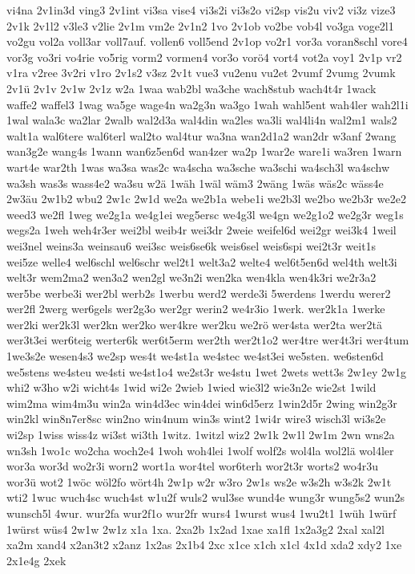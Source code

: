 {vi4na
2v1in3d
ving3
2v1int
vi3sa
vise4
vi3s2i
vi3s2o
vi2sp
vis2u
viv2
vi3z
vize3
2v1k
2v1l2
v3le3
v2lie
2v1m
vm2e
2v1n2
1vo
2v1ob
vo2be
vob4l
vo3ga
voge2l1
vo2gu
vol2a
voll3ar
voll7auf.
vollen6
voll5end
2v1op
vo2r1
vor3a
voran8schl
vore4
vor3g
vo3ri
vo4rie
vo5rig
vorm2
vormen4
vor3o
vorö4
vort4
vot2a
voy1
2v1p
vr2
v1ra
v2ree
3v2ri
v1ro
2v1s2
v3sz
2v1t
vue3
vu2enu
vu2et
2vumf
2vumg
2vumk
2v1ü
2v1v
2v1w
2v1z
w2a
1waa
wab2bl
wa3che
wach8stub
wach4t4r
1wack
waffe2
waffel3
1wag
wa5ge
wage4n
wa2g3n
wa3go
1wah
wahl5ent
wah4ler
wah2l1i
1wal
wala3c
wa2lar
2walb
wal2d3a
wal4din
wa2les
wa3li
wal4li4n
wal2m1
wals2
walt1a
wal6tere
wal6terl
wal2to
wal4tur
wa3na
wan2d1a2
wan2dr
w3anf
2wang
wan3g2e
wang4s
1wann
wan6z5en6d
wan4zer
wa2p
1war2e
ware1i
wa3ren
1warn
wart4e
war2th
1was
wa3sa
was2c
wa4scha
wa3sche
wa3schi
wa4sch3l
wa4schw
wa3sh
was3s
wass4e2
wa3su
w2ä
1wäh
1wäl
wäm3
2wäng
1wäs
wäs2c
wäss4e
2w3äu
2w1b2
wbu2
2w1c
2w1d
we2a
we2b1a
webe1i
we2b3l
we2bo
we2b3r
we2e2
weed3
we2fl
1weg
we2g1a
we4g1ei
weg5ersc
we4g3l
we4gn
we2g1o2
we2g3r
weg1s
wegs2a
1weh
weh4r3er
wei2bl
weib4r
wei3dr
2weie
weifel6d
wei2gr
wei3k4
1weil
wei3nel
weins3a
weinsau6
wei3sc
weis6se6k
weis6sel
weis6spi
wei2t3r
weit1s
wei5ze
welle4
wel6schl
wel6schr
wel2t1
welt3a2
welte4
wel6t5en6d
wel4th
welt3i
welt3r
wem2ma2
wen3a2
wen2gl
we3n2i
wen2ka
wen4kla
wen4k3ri
we2r3a2
wer5be
werbe3i
wer2bl
werb2s
1werbu
werd2
werde3i
5werdens
1werdu
werer2
wer2fl
2werg
wer6gels
wer2g3o
wer2gr
werin2
we4r3io
1werk.
wer2k1a
1werke
wer2ki
wer2k3l
wer2kn
wer2ko
wer4kre
wer2ku
we2rö
wer4sta
wer2ta
wer2tä
wer3t3ei
wer6teig
werter6k
wer6t5erm
wer2th
wer2t1o2
wer4tre
wer4t3ri
wer4tum
1we3s2e
wesen4s3
we2sp
wes4t
we4st1a
we4stec
we4st3ei
we5sten.
we6sten6d
we5stens
we4steu
we4sti
we4st1o4
we2st3r
we4stu
1wet
2wets
wett3s
2w1ey
2w1g
whi2
w3ho
w2i
wicht4s
1wid
wi2e
2wieb
1wied
wie3l2
wie3n2e
wie2st
1wild
wim2ma
wim4m3u
win2a
win4d3ec
win4dei
win6d5erz
1win2d5r
2wing
win2g3r
win2kl
win8n7er8sc
win2no
win4num
win3s
wint2
1wi4r
wire3
wisch3l
wi3s2e
wi2sp
1wiss
wiss4z
wi3st
wi3th
1witz.
1witzl
wiz2
2w1k
2w1l
2w1m
2wn
wns2a
wn3sh
1wo1c
wo2cha
woch2e4
1woh
woh4lei
1wolf
wolf2s
wol4la
wol2lä
wol4ler
wor3a
wor3d
wo2r3i
worn2
wort1a
wor4tel
wor6terh
wor2t3r
worts2
wo4r3u
wor3ü
wot2
1wöc
wöl2fo
wört4h
2w1p
w2r
w3ro
2w1s
ws2e
w3s2h
w3s2k
2w1t
wti2
1wuc
wuch4sc
wuch4st
w1u2f
wuls2
wul3se
wund4e
wung3r
wung5s2
wun2s
wunsch5l
4wur.
wur2fa
wur2f1o
wur2fr
wurs4
1wurst
wus4
1wu2t1
1wüh
1würf
1würst
wüs4
2w1w
2w1z
x1a
1xa.
2xa2b
1x2ad
1xae
xa1fl
1x2a3g2
2xal
xal2l
xa2m
xand4
x2an3t2
x2anz
1x2as
2x1b4
2xc
x1ce
x1ch
x1cl
4x1d
xda2
xdy2
1xe
2x1e4g
2xek
}
